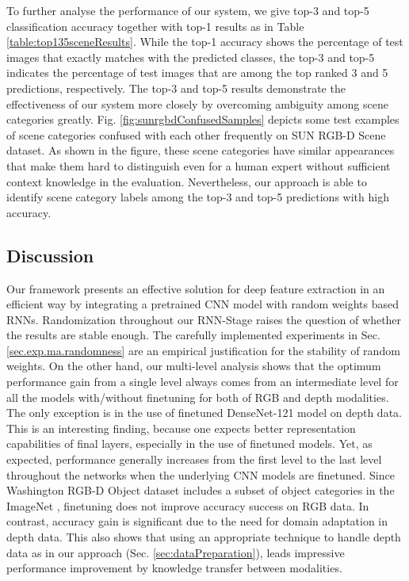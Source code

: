 \documentclass[10pt,journal,compsoc]{IEEEtran}
\begin{document}
To further analyse the performance of our system, we give top-3 and top-5 classification accuracy together with top-1 results as in Table \ref{table:top135sceneResults}. While the top-1 accuracy shows the percentage of test images that exactly matches with the predicted classes, the top-3 and top-5 indicates the percentage of test images that are among the top ranked 3 and 5 predictions, respectively. The top-3 and top-5 results demonstrate the effectiveness of our system more closely by overcoming ambiguity among scene categories greatly. Fig. \ref{fig:sunrgbdConfusedSamples} depicts some test examples of scene categories confused with each other frequently on SUN RGB-D Scene dataset. As shown in the figure, these scene categories have similar appearances that make them hard to distinguish even for a human expert without sufficient context knowledge in the evaluation. Nevertheless, our approach is able to identify scene category labels among the top-3 and top-5 predictions with high accuracy.


\subsection{Discussion} \label{sec:exp.discussion}
Our framework presents an effective solution for deep feature extraction in an efficient way by integrating a pretrained CNN model with random weights based RNNs. Randomization throughout our RNN-Stage raises the question of whether the results are stable enough. The carefully implemented experiments in Sec. \ref{sec.exp.ma.randomness} are an empirical justification for the stability of random weights. On the other hand, our multi-level analysis shows that the optimum performance gain from a single level always comes from an intermediate level for all the models with/without finetuning for both of RGB and depth modalities. The only exception is in the use of finetuned DenseNet-121 model on depth data. This is an interesting finding, because one expects better representation capabilities of final layers, especially in the use of finetuned models. Yet, as expected, performance generally increases from the first level to the last level throughout the networks when the underlying CNN models are finetuned. Since Washington RGB-D Object \cite{Lai_ICRA_2011} dataset includes a subset of object categories in the ImageNet \cite{Deng_Imagenet_CVPR_2009}, finetuning does not improve accuracy success on RGB data. In contrast, accuracy gain is significant due to the need for domain adaptation in depth data. This also shows that using an appropriate technique to handle depth data as in our approach (Sec. \ref{sec:dataPreparation}), leads impressive performance improvement by knowledge transfer between modalities. 
\end{document}
